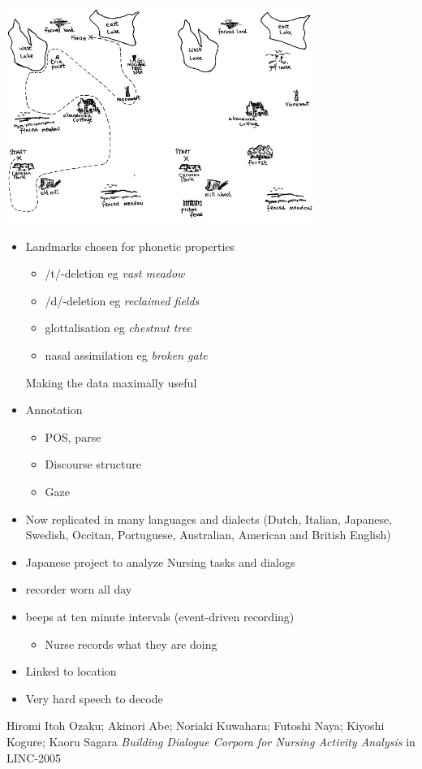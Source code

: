 \documentclass[a4paper,landscape,headrule,footrule,xetex]{foils}
\begin{document}

\begin{center}
  \includegraphics[width=0.75\textwidth]{include/maps}
\end{center}


\begin{itemize}
\item Landmarks chosen for phonetic properties
  \begin{itemize}
\item /t/-deletion eg \textit{vast meadow}
\item /d/-deletion eg \textit{reclaimed fields}
\item glottalisation eg \textit{chestnut tree}
\item nasal assimilation eg \textit{broken gate }
\end{itemize}
Making the data maximally useful
\item Annotation
  \begin{itemize}
  \item POS, parse
  \item Discourse structure
  \item Gaze
  \end{itemize}
\item Now replicated in many languages and dialects (Dutch, Italian, Japanese, Swedish, Occitan, Portuguese, Australian, American and British English)
\end{itemize}

\begin{itemize}
\item Japanese project to analyze Nursing tasks and dialogs
\item recorder worn all day
\item beeps at ten minute intervals  (event-driven recording)
  \begin{itemize}
  \item Nurse records what they are doing
  \end{itemize}
\item Linked to location
\item Very hard speech to decode
\end{itemize}
Hiromi Itoh Ozaku; Akinori Abe; Noriaki Kuwahara; Futoshi Naya; Kiyoshi Kogure; Kaoru Sagara
\textit{Building Dialogue Corpora for Nursing Activity Analysis} in LINC-2005
\end{document}
